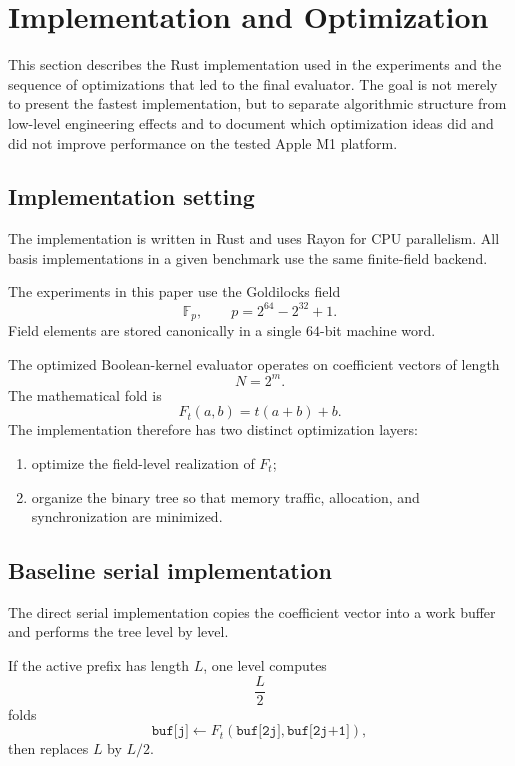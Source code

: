 \section{Implementation and Optimization}
\label{sec:implementation}

This section describes the Rust implementation used in the experiments and
the sequence of optimizations that led to the final evaluator.  The goal is
not merely to present the fastest implementation, but to separate
algorithmic structure from low-level engineering effects and to document
which optimization ideas did and did not improve performance on the tested
Apple M1 platform.

\subsection{Implementation setting}

The implementation is written in Rust and uses Rayon for CPU parallelism.
All basis implementations in a given benchmark use the same finite-field
backend.

The experiments in this paper use the Goldilocks field
\[
\mathbb{F}_p,
\qquad
p=2^{64}-2^{32}+1.
\]
Field elements are stored canonically in a single \(64\)-bit machine word.

The optimized Boolean-kernel evaluator operates on coefficient vectors of
length
\[
N=2^m.
\]
The mathematical fold is
\[
F_t(a,b)=t(a+b)+b.
\]
The implementation therefore has two distinct optimization layers:

\begin{enumerate}
    \item optimize the field-level realization of \(F_t\);
    \item organize the binary tree so that memory traffic, allocation, and
    synchronization are minimized.
\end{enumerate}

\subsection{Baseline serial implementation}

The direct serial implementation copies the coefficient vector into a work
buffer and performs the tree level by level.

If the active prefix has length \(L\), one level computes
\[
\frac{L}{2}
\]
folds
\[
\texttt{buf[j]}
\leftarrow
F_t(\texttt{buf[2j]},\texttt{buf[2j+1]}),
\]
then replaces \(L\) by \(L/2\).

